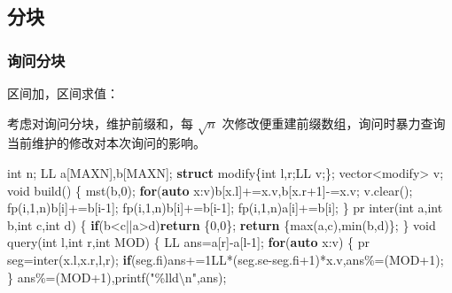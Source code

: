 \documentclass[
]{article}
\newenvironment{Shaded}{}{}
\newcommand{\BuiltInTok}[1]{#1}
\newcommand{\ControlFlowTok}[1]{\textcolor[rgb]{0.00,0.44,0.13}{\textbf{#1}}}
\newcommand{\DataTypeTok}[1]{\textcolor[rgb]{0.56,0.13,0.00}{#1}}
\newcommand{\DecValTok}[1]{\textcolor[rgb]{0.25,0.63,0.44}{#1}}
\newcommand{\KeywordTok}[1]{\textcolor[rgb]{0.00,0.44,0.13}{\textbf{#1}}}
\newcommand{\NormalTok}[1]{#1}
\newcommand{\SpecialCharTok}[1]{\textcolor[rgb]{0.25,0.44,0.63}{#1}}
\newcommand{\StringTok}[1]{\textcolor[rgb]{0.25,0.44,0.63}{#1}}
\begin{document}
\hypertarget{ux5206ux5757}{%
\subsection{分块}\label{ux5206ux5757}}

\hypertarget{ux8be2ux95eeux5206ux5757}{%
\subsubsection{询问分块}\label{ux8be2ux95eeux5206ux5757}}

区间加，区间求值：

考虑对询问分块，维护前缀和，每 \(\sqrt{n}\)
次修改便重建前缀数组，询问时暴力查询当前维护的修改对本次询问的影响。

\begin{Shaded}
\begin{Highlighting}[]
\DataTypeTok{int}\NormalTok{ n;}
\NormalTok{LL  a[MAXN],b[MAXN];}
\KeywordTok{struct}\NormalTok{ modify\{}\DataTypeTok{int}\NormalTok{ l,r;LL v;\};}
\NormalTok{vector\textless{}modify\textgreater{} v;}
\DataTypeTok{void}\NormalTok{ build()}
\NormalTok{\{}
\NormalTok{    mst(b,}\DecValTok{0}\NormalTok{);}
    \ControlFlowTok{for}\NormalTok{(}\KeywordTok{auto}\NormalTok{ x:v)b[x.l]+=x.v,b[x.r+}\DecValTok{1}\NormalTok{]{-}=x.v;}
\NormalTok{    v.clear();}
\NormalTok{    fp(i,}\DecValTok{1}\NormalTok{,n)b[i]+=b[i{-}}\DecValTok{1}\NormalTok{];}
\NormalTok{    fp(i,}\DecValTok{1}\NormalTok{,n)b[i]+=b[i{-}}\DecValTok{1}\NormalTok{];}
\NormalTok{    fp(i,}\DecValTok{1}\NormalTok{,n)a[i]+=b[i];}
\NormalTok{\}}
\NormalTok{pr inter(}\DataTypeTok{int}\NormalTok{ a,}\DataTypeTok{int}\NormalTok{ b,}\DataTypeTok{int}\NormalTok{ c,}\DataTypeTok{int}\NormalTok{ d)}
\NormalTok{\{}
    \ControlFlowTok{if}\NormalTok{(b\textless{}c||a\textgreater{}d)}\ControlFlowTok{return}\NormalTok{ \{}\DecValTok{0}\NormalTok{,}\DecValTok{0}\NormalTok{\};}
    \ControlFlowTok{return}\NormalTok{ \{max(a,c),min(b,d)\};}
\NormalTok{\}}
\DataTypeTok{void}\NormalTok{ query(}\DataTypeTok{int}\NormalTok{ l,}\DataTypeTok{int}\NormalTok{ r,}\DataTypeTok{int}\NormalTok{ MOD)}
\NormalTok{\{}
\NormalTok{    LL ans=a[r]{-}a[l{-}}\DecValTok{1}\NormalTok{];}
    \ControlFlowTok{for}\NormalTok{(}\KeywordTok{auto}\NormalTok{ x:v)}
\NormalTok{    \{}
\NormalTok{        pr seg=inter(x.l,x.r,l,r);}
        \ControlFlowTok{if}\NormalTok{(seg.fi)ans+=}\DecValTok{1}\BuiltInTok{LL}\NormalTok{*(seg.se{-}seg.fi+}\DecValTok{1}\NormalTok{)*x.v,ans\%=(MOD+}\DecValTok{1}\NormalTok{);}
\NormalTok{    \}}
\NormalTok{    ans\%=(MOD+}\DecValTok{1}\NormalTok{),printf(}\StringTok{"}\SpecialCharTok{\%lld\textbackslash{}n}\StringTok{"}\NormalTok{,ans);}

\end{Highlighting}
\end{Shaded}
\end{document}
